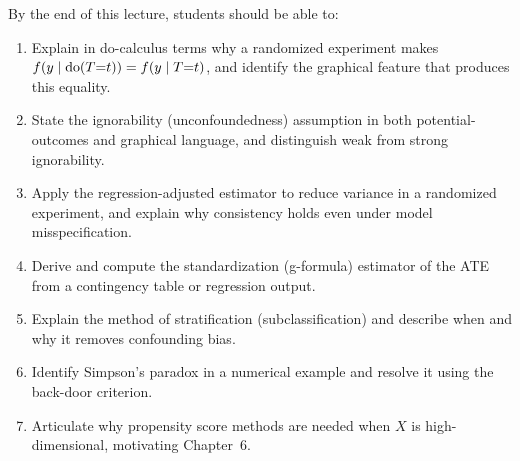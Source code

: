 \documentclass[master.tex]{subfiles}
\begin{document}

\begin{tcolorbox}[defstyle, title={Learning Objectives}]
By the end of this lecture, students should be able to:
\begin{enumerate}
  \item Explain in do-calculus terms why a randomized experiment makes
    $f(y \mid \mathrm{do}(T{=}t)) = f(y \mid T{=}t)$, and identify the
    graphical feature that produces this equality.
  \item State the ignorability (unconfoundedness) assumption in both
    potential-outcomes and graphical language, and distinguish weak from
    strong ignorability.
  \item Apply the regression-adjusted estimator to reduce variance in a
    randomized experiment, and explain why consistency holds even under
    model misspecification.
  \item Derive and compute the standardization (g-formula) estimator
    of the ATE from a contingency table or regression output.
  \item Explain the method of stratification (subclassification) and
    describe when and why it removes confounding bias.
  \item Identify Simpson's paradox in a numerical example and resolve
    it using the back-door criterion.
  \item Articulate why propensity score methods are needed when $X$ is
    high-dimensional, motivating Chapter~6.
\end{enumerate}
\end{tcolorbox}
\end{document}
